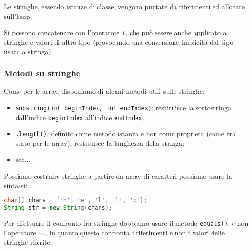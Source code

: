 \documentclass[a4paper,11pt]{article}
\begin{document}
Le stringhe, essendo istanze di classe, vengono puntate da riferimenti ed allocate sull'heap.

Si possono concatenare con l'operatore \lstinline|+|, che può essere anche applicato a stringhe e valori di altro tipo (provocando una conversione implicita dal tipo usato a stringa).

\subsubsection{Metodi su stringhe}
Come per le array, disponiamo di alcuni metodi utili sulle stringhe:
\begin{itemize}
	\item \lstinline|substring(int beginIndex, int endIndex)|: restituisce la sottostringa dall'indice \lstinline|beginIndex| all'indice \lstinline|endIndex|;
	\item \lstinline|.length()|, definito come metodo istanza e non come proprieta (come era stato per le array), restituisce la lunghezza della stringa;
	\item ecc...
\end{itemize}

Possiamo costruire stringhe a partire da array di caratteri possiamo usare la sintassi: 
\begin{lstlisting}[language=java, style=codestyle]
char[] chars = {'h', 'e', 'l', 'l', 'o'};
String str = new String(chars);
\end{lstlisting}

Per effettuare il confronto fra stringhe dobbiamo usare il metodo \lstinline|equals()|, e non l'operatore \lstinline|==|, in quanto questo confronta i riferimenti e non i valori delle stringhe riferite.
\end{document}
